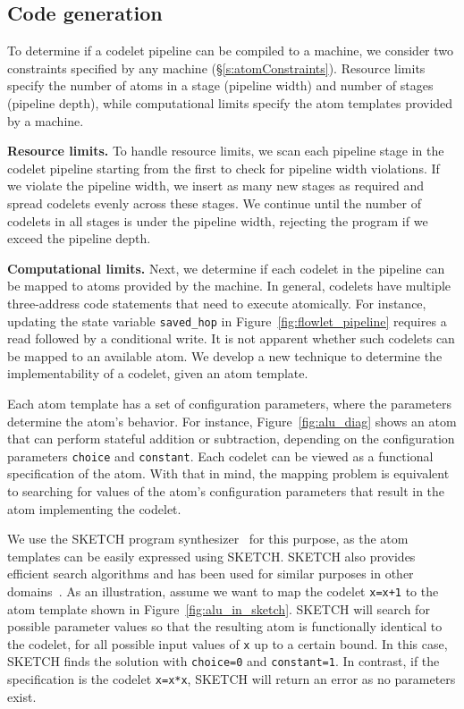 \subsection{Code generation}
\label{ss:code_gen}

To determine if a codelet pipeline can be compiled to a \absmachine machine, we
consider two constraints specified by any \absmachine machine
(\S\ref{s:atomConstraints}).  Resource limits specify the number of atoms in a
stage (pipeline width) and number of stages (pipeline depth), while
computational limits specify the atom templates provided by a \absmachine
machine.

\medskip
\noindent
\textbf{Resource limits.} To handle resource limits, we scan each pipeline
stage in the codelet pipeline starting from the first to check for pipeline
width violations. If we violate the pipeline width, we insert as many new
stages as required and spread codelets evenly across these stages.  We continue
until the number of codelets in all stages is under the pipeline width,
rejecting the program if we exceed the pipeline depth.

\medskip
\noindent
\textbf{Computational limits.} Next, we determine if each codelet in the pipeline
can be mapped to atoms provided by the \absmachine machine. In general,
codelets have multiple three-address code statements that need to execute
atomically. For instance, updating the state variable \texttt{saved\_hop} in
Figure~\ref{fig:flowlet_pipeline} requires a read followed by a conditional
write.  It is not apparent whether such codelets can be mapped to an available
atom. We develop a new technique to determine the implementability of a codelet,
given an atom template.

Each atom template has a set of configuration parameters, where the parameters
determine the atom's behavior.  For instance, Figure~\ref{fig:alu_diag} shows
an atom that can perform stateful addition or subtraction, depending on the
configuration parameters {\tt choice} and {\tt constant}.  Each codelet can be
viewed as a functional specification of the atom.  With that in mind, the
mapping problem is equivalent to searching for values of the atom's configuration
parameters that result in the atom implementing the codelet.

We use the SKETCH program synthesizer~\cite{sketch_asplos} for this purpose, as
the atom templates can be easily expressed using SKETCH. SKETCH also
provides efficient search algorithms and has been used for similar purposes in
other domains~\cite{lifejoin, qbs}. As an
illustration, assume we want to map the codelet {\tt x=x+1} to the atom
template shown in Figure~\ref{fig:alu_in_sketch}. SKETCH will search for
possible parameter values so that the resulting atom is functionally identical
to the codelet, for all possible input values of {\tt x} up to a certain bound. 
In this case, SKETCH
finds the solution with {\tt choice=0} and {\tt constant=1}.  In contrast, if
the specification is the codelet {\tt x=x*x}, SKETCH will return
an error as no parameters exist.


